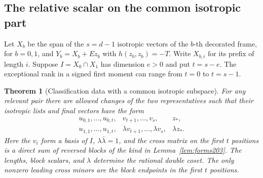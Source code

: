 \documentclass[a4paper,11pt]{article}
\newtheorem{theorem}[proposition]{Theorem}
\theoremstyle{definition}
\theoremstyle{remark}
\numberwithin{equation}{section}
\begin{document}
\subsection{The relative scalar on the common isotropic part}\label{nav:VII-34}
Let \(X_b\) be the span of the \(s=d-1\) isotropic vectors of
the \(b\)-th decorated frame, for \(b=0,1\), and \(Y_b=X_b+Ez_b\)
with \(h(z_b,z_b)=-T\). Write \(X_{b,i}\) for its prefix of
length \(i\). Suppose \(I=X_0\cap X_1\) has dimension \(e>0\)
and put \(t=s-e\). The exceptional rank in a signed first
moment can range from \(t=0\) to \(t=s-1\).

\begin{theorem}[Classification data with a common isotropic subspace]
\leavevmode\label{thm:suffix237}
For any relevant pair there are allowed changes of the two
representatives such that their isotropic lists and final
vectors have the form
\[
\begin{array}{llll}
 u_{0,1},\ldots,u_{0,t},& v_{t+1},\ldots,v_s,& z_*,\\
 u_{1,1},\ldots,u_{1,t},& \lambda v_{t+1},\ldots,\lambda v_s,
       &\lambda z_* .
\end{array}
\]
Here the \(v_i\) form a basis of \(I\), \(\lambda\bar\lambda=1\),
and the cross matrix on the first \(t\) positions is a direct
sum of reversed blocks of the kind in Lemma~\ref{lem:forms203}.
The lengths, block scalars, and \(\lambda\) determine the
rational double coset. The only nonzero leading cross minors
are the block endpoints in the first \(t\) positions.
\end{theorem}
\end{document}
